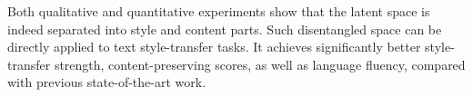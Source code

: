 \documentclass[letterpaper]{article} %
\begin{document}
Both qualitative and quantitative experiments show that the latent space is indeed separated into style and content parts.
Such  disentangled space can be directly applied to text style-transfer tasks.
It achieves significantly better style-transfer strength, content-preserving scores, as well as language fluency, compared with previous state-of-the-art work.









\end{document}
